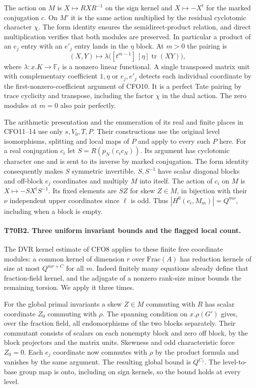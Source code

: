 The action on $M$ is $X\mapsto RXR^{-1}$ on the sign kernel and
$X\mapsto-X^t$ for the marked conjugation $c$. On $M'$ it is the
same action multiplied by the residual cyclotomic character
$\chi$. The form identity ensures the semidirect-product relation,
and direct multiplication verifies that both modules are preserved.
In particular a product of an $e_j$ entry with an $e'_j$ entry
lands in the $\eta$ block. At $m>0$ the pairing is
\[
 (X,Y)\longmapsto
      \lambda\bigl([t^{m-1}]\,[\eta]\operatorname{tr}(XY)\bigr),
\]
where $\lambda:x.K\to\mathbb F_\ell$ is a nonzero linear
functional. A single transposed matrix unit with complementary
coefficient $1,\eta$ or $e_j,e'_j$ detects each individual
coordinate by the first-nonzero-coefficient argument of CFO10.
It is a perfect Tate pairing by trace cyclicity and transpose,
including the factor $\chi$ in the dual action. The zero modules
at $m=0$ also pair perfectly.

The arithmetic presentation and the enumeration of its real and
finite places in CFO11--14 use only $s,V_0,T,P$. Their constructions
use the original level isomorphisms, splitting and local maps
of $P$ and apply to every such $P$ here. For a real conjugation
$c_i$ let $S=R(p_N(c_ic_N))$. Its argument has cyclotomic
character one and is sent to its inverse by marked conjugation.
The form identity consequently makes $S$ symmetric invertible.
$S,S^{-1}$ have scalar diagonal blocks and off-block $e_j$
coordinates and multiply $M$ into itself. The action of $c_i$
on $M$ is $X\mapsto-SX^tS^{-1}$. Its fixed elements are $SZ$
for skew $Z\in M$, in bijection with their $\nu$ independent
upper coordinates since $\ell$ is odd. Thus
$|H^0(c_i,M_m)|=Q^{m\nu}$, including when a block is empty.

\paragraph{T70B2. Three uniform invariant bounds and the flagged local count.}
The DVR kernel estimate of CFO8 applies to these finite free
coordinate modules: a common kernel of dimension $r$ over
$\mathrm{Frac}(A)$ has reduction kernels of size at most
$Q^{mr+C}$ for all $m$. Indeed finitely many equations already
define that fraction-field kernel, and the adjugate of a
nonzero rank-size minor bounds the remaining torsion. We
apply it three times.

For the global primal invariants a skew $Z\in M$ commuting
with $R$ has scalar coordinate $Z_0$ commuting with $\rho$.
The spanning condition on $x.\rho(G')$ gives, over the fraction
field, all endomorphisms of the two blocks separately. Their
commutant consists of scalars on each nonempty block and zero
off block, by the block projectors and the matrix units.
Skewness and odd characteristic force $Z_0=0$. Each $e_j$
coordinate now commutes with $\rho$ by the product formula
and vanishes by the same argument. The resulting global bound
is $Q^{C_1}$. The level-to-base group map is onto, including
on sign kernels, so the bound holds at every level.

